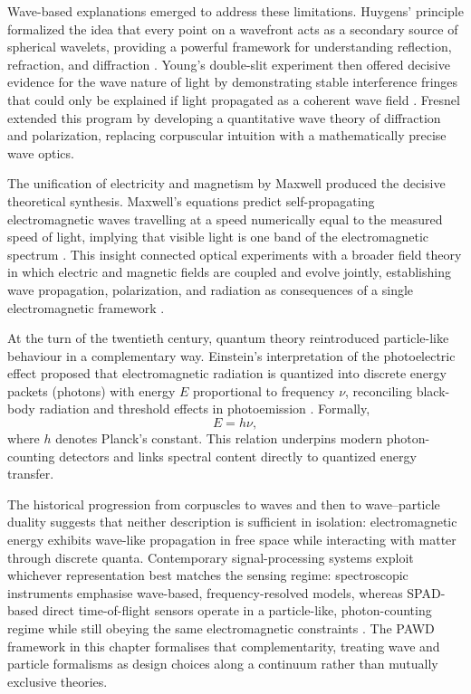 \documentclass[12pt,a4paper,oneside]{report}
\begin{document}
Wave-based explanations emerged to address these limitations. Huygens' principle formalized the idea that every point on a wavefront acts as a secondary source of spherical wavelets, providing a powerful framework for understanding reflection, refraction, and diffraction \cite{crew1900}. Young's double-slit experiment then offered decisive evidence for the wave nature of light by demonstrating stable interference fringes that could only be explained if light propagated as a coherent wave field \cite{young1804}. Fresnel extended this program by developing a quantitative wave theory of diffraction and polarization, replacing corpuscular intuition with a mathematically precise wave optics.

The unification of electricity and magnetism by Maxwell produced the decisive theoretical synthesis. Maxwell's equations predict self-propagating electromagnetic waves travelling at a speed numerically equal to the measured speed of light, implying that visible light is one band of the electromagnetic spectrum \cite{griffiths2017,schott2007}. This insight connected optical experiments with a broader field theory in which electric and magnetic fields are coupled and evolve jointly, establishing wave propagation, polarization, and radiation as consequences of a single electromagnetic framework \cite{griffiths2017,sadiku}.

At the turn of the twentieth century, quantum theory reintroduced particle-like behaviour in a complementary way. Einstein's interpretation of the photoelectric effect proposed that electromagnetic radiation is quantized into discrete energy packets (photons) with energy $E$ proportional to frequency $\nu$, reconciling black-body radiation and threshold effects in photoemission \cite{bohr1923,griffiths2017}. Formally,
\begin{equation}
E = h \nu,
\label{eq:photon_energy}
\end{equation}
where $h$ denotes Planck's constant. This relation underpins modern photon-counting detectors and links spectral content directly to quantized energy transfer.

The historical progression from corpuscles to waves and then to wave--particle duality suggests that neither description is sufficient in isolation: electromagnetic energy exhibits wave-like propagation in free space while interacting with matter through discrete quanta. Contemporary signal-processing systems exploit whichever representation best matches the sensing regime: spectroscopic instruments emphasise wave-based, frequency-resolved models, whereas SPAD-based direct time-of-flight sensors operate in a particle-like, photon-counting regime while still obeying the same electromagnetic constraints \cite{griffiths2017,elachi2021}. The PAWD framework in this chapter formalises that complementarity, treating wave and particle formalisms as design choices along a continuum rather than mutually exclusive theories.
\end{document}
